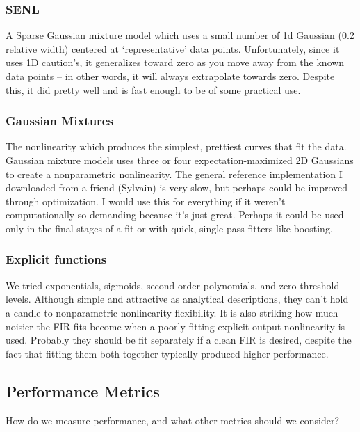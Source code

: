 \documentclass[11pt]{article}
\begin{document}
\subsubsection{SENL}
\label{sec-2.6.4}


    A Sparse Gaussian mixture model which uses a small number of 1d Gaussian (0.2 relative width) centered at `representative' data points. Unfortunately, since it uses 1D caution's, it generalizes toward zero as you move away from the known data points -- in other words, it will always extrapolate towards zero. Despite this, it did pretty well and is fast enough to be of some practical use. 

\subsubsection{Gaussian Mixtures}
\label{sec-2.6.5}


    The nonlinearity which produces the simplest, prettiest curves that fit the data. Gaussian mixture models uses three or four expectation-maximized 2D Gaussians to create a nonparametric nonlinearity. The general reference implementation I downloaded from a friend (Sylvain) is very slow, but perhaps could be improved through optimization. I would use this for everything if it weren't computationally so demanding because it's just great. Perhaps it could be used only in the final stages of a fit or with quick, single-pass fitters like boosting. 

\subsubsection{Explicit functions}
\label{sec-2.6.6}

    
    We tried exponentials, sigmoids, second order polynomials, and zero threshold levels. Although simple and attractive as analytical descriptions, they can't hold a candle to nonparametric nonlinearity flexibility. It is also striking how much noisier the FIR fits become when a poorly-fitting explicit output nonlinearity is used. Probably they should be fit separately if a clean FIR is desired, despite the fact that fitting them both together typically produced higher performance. 

\subsection{Performance Metrics}
\label{sec-2.7}


   How do we measure performance, and what other metrics should we consider?
\end{document}
